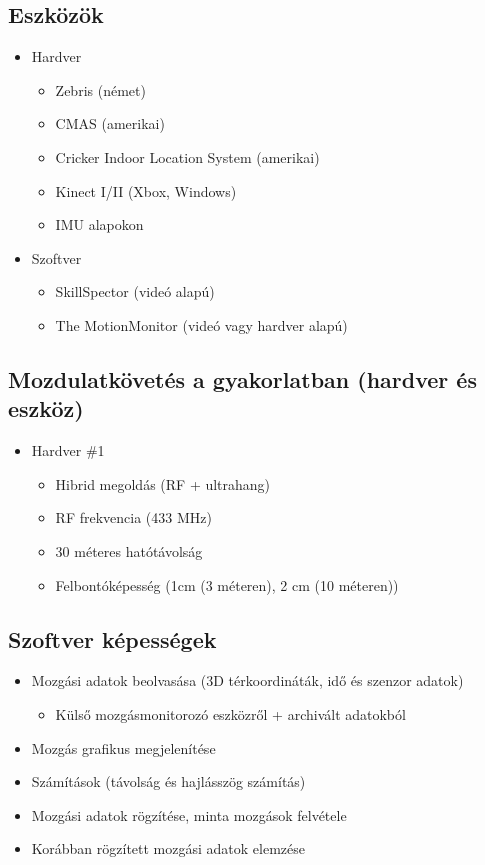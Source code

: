 \subsection{Eszközök}
\begin{itemize}
    \item Hardver
    \begin{itemize}
        \item Zebris (német)
        \item CMAS (amerikai)
        \item Cricker Indoor Location System (amerikai)
        \item Kinect I/II (Xbox, Windows)
        \item IMU alapokon
    \end{itemize}
    \item Szoftver
    \begin{itemize}
        \item SkillSpector (videó alapú)
        \item The MotionMonitor (videó vagy hardver alapú)
    \end{itemize}
\end{itemize}

\subsection{Mozdulatkövetés a gyakorlatban (hardver és eszköz)}
\begin{itemize}
    \item Hardver \#1
    \begin{itemize}
        \item Hibrid megoldás (RF + ultrahang)
        \item RF frekvencia (433 MHz)
        \item 30 méteres hatótávolság
        \item Felbontóképesség (1cm (3 méteren), 2 cm (10 méteren))
    \end{itemize}
\end{itemize}

\subsection{Szoftver képességek}
\begin{itemize}
    \item Mozgási adatok beolvasása (3D térkoordináták, idő és szenzor adatok)
    \begin{itemize}
        \item Külső mozgásmonitorozó eszközről + archivált adatokból
    \end{itemize}
    \item Mozgás grafikus megjelenítése
    \item Számítások (távolság és hajlásszög számítás)
    \item Mozgási adatok rögzítése, minta mozgások felvétele
    \item Korábban rögzített mozgási adatok elemzése
\end{itemize}